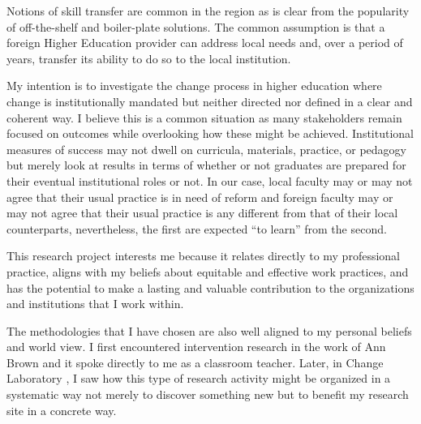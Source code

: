 \documentclass[a4paper,man,natbib]{apa6}
\begin{document}
Notions of skill transfer are common in the region as is clear from the popularity of off-the-shelf and boiler-plate solutions. The common assumption is that a foreign Higher Education provider can address local needs and, over a period of years, transfer its ability to do so to the local institution. 
\newline


My intention is to investigate the change process in higher education where change is institutionally mandated but neither directed nor defined in a clear and coherent way. I believe this is a common situation as many stakeholders remain focused on outcomes while overlooking how these might be achieved. Institutional measures of success may not dwell on curricula, materials, practice, or pedagogy but merely look at results in terms of whether or not graduates are prepared for their eventual institutional roles or not. In our case, local faculty may or may not agree that their usual practice is in need of reform and foreign faculty may or may not agree that their usual practice is any different from that of their local counterparts, nevertheless, the first are expected ``to learn'' from the second. 
\newline


This research project interests me because it relates directly to my professional practice, aligns with my beliefs about equitable and effective work practices, and has the potential to make a lasting and valuable contribution to the organizations and institutions that I work within.

The methodologies that I have chosen are also well aligned to my  personal beliefs and world view. I first encountered intervention research in the work of Ann Brown \citep{brown1992design} and it spoke directly to me as a classroom teacher. Later, in Change Laboratory \citep{Virkkunen2013change}, I saw how this type of research activity might be organized in a systematic way not merely to discover something new but to benefit my research site in a concrete way. 
\end{document}

